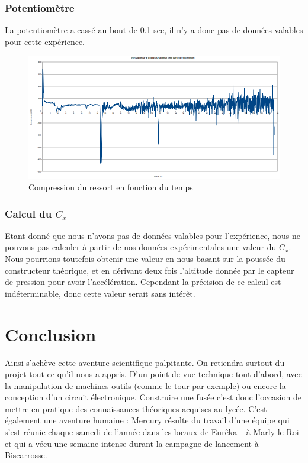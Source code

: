 \documentclass[a4paper,12pt]{scrartcl}
\begin{document}
	  \subsubsection{Potentiomètre}
	  La potentiomètre a cassé au bout de 0.1 sec, il n'y a donc pas de données valables pour cette expérience.
	  \begin{figure}[H]
		\begin{center}
		    \caption{ Compression du ressort en fonction du temps }
		    \includegraphics[height=208px, width=424px]{analyse/compression-ressort.png}
		\end{center}
	  \end{figure}		 
	  \subsubsection{Calcul du $C_x$}
	  Etant donné que nous n'avons pas de données valables pour l'expérience, nous ne pouvons pas calculer à partir de nos données expérimentales une valeur du $C_x$.
	  Nous pourrions toutefois obtenir une valeur en nous basant sur la poussée du constructeur théorique, et en dérivant deux fois l'altitude donnée par le capteur de pression pour avoir l'accélération.
	  Cependant la précision de ce calcul est indéterminable, donc cette valeur serait sans intérêt.
	 \newpage
	  \section{Conclusion}
	  
	  Ainsi s'achève cette aventure scientifique palpitante. On retiendra surtout du projet tout ce qu'il nous a appris.
	  D'un point de vue technique tout d'abord, avec la manipulation de machines outils (comme le tour par exemple) ou encore la conception d'un circuit électronique.
	  Construire une fusée c'est donc l'occasion de mettre en pratique des connaissances théoriques acquises au lycée.
	  C'est également une aventure humaine : Mercury résulte du travail d'une équipe qui s'est réunie chaque samedi de l'année dans les locaux de Eurêka+ à Marly-le-Roi et qui a vécu une semaine intense durant la campagne de lancement à Biscarrosse.
	  
\end{document}
